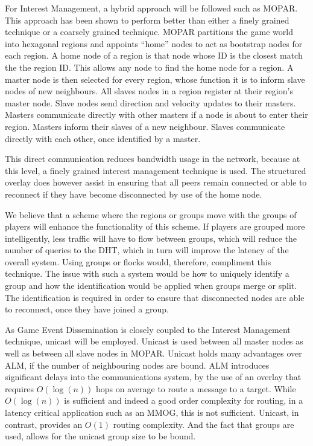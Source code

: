\documentclass[journal,oneside,a4paper,onecolumn]{IEEEtran}
\begin{document}
For Interest Management, a hybrid approach will be followed such as MOPAR. This approach has been shown to perform better than either a finely grained technique or a coarsely grained technique. MOPAR partitions the game world into hexagonal regions and appoints ``home'' nodes to act as bootstrap nodes for each region. A home node of a region is that node whose ID is the closest match the the region ID. This allows any node to find the home node for a region. A master node is then selected for every region, whose function it is to inform slave nodes of new neighbours. All slaves nodes in a region register at their region's master node. Slave nodes send direction and velocity updates to their masters. Masters communicate directly with other masters if a node is about to enter their region. Masters inform their slaves of a new neighbour. Slaves communicate directly with each other, once identified by a master.

This direct communication reduces bandwidth usage in the network, because at this level, a finely grained interest management technique is used. The structured overlay does however assist in ensuring that all peers remain connected or able to reconnect if they have become disconnected by use of the home node.

We believe that a scheme where the regions or groups move with the groups of players will enhance the functionality of this scheme. If players are grouped more intelligently, less traffic will have to flow between groups, which will reduce the number of queries to the DHT, which in turn will improve the latency of the overall system. Using groups or flocks would, therefore, compliment this technique. The issue with such a system would be how to uniquely identify a group and how the identification would be applied when groups merge or split. The identification is required in order to ensure that disconnected nodes are able to reconnect, once they have joined a group.

As Game Event Dissemination is closely coupled to the Interest Management technique, unicast will be employed. Unicast is used between all master nodes as well as between all slave nodes in MOPAR. Unicast holds many advantages over ALM, if the number of neighbouring nodes are bound. ALM introduces significant delays into the communications system, by the use of an overlay that requires $O(\log(n))$ hops on average to route a message to a target. While $O(\log(n))$ is sufficient and indeed a good order complexity for routing, in a latency critical application such as an MMOG, this is not sufficient. Unicast, in contrast, provides an $O(1)$ routing complexity. And the fact that groups are used, allows for the unicast group size to be bound.
\end{document}
